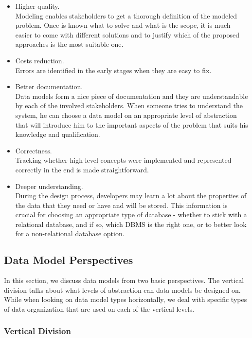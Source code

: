 \begin{itemize}
	\item Higher quality.\\ Modeling enables stakeholders to get a thorough definition of the modeled problem. Once is known what to solve and what is the scope, it is much easier to come with different solutions and to justify which of the proposed approaches is the most suitable one.
	
	\item Costs reduction.\\ Errors are identified in the early stages when they are easy to fix.
	
	\item Better documentation.\\ Data models form a nice piece of documentation and they are understandable by each of the involved stakeholders. When someone tries to understand the system, he can choose a data model on an appropriate level of abstraction that will introduce him to the important aspects of the problem that suits his knowledge and qualification.
	
	\item Correctness.\\ Tracking whether high-level concepts were implemented and represented correctly in the end is made straightforward.
	
	\item Deeper understanding.\\ During the design process, developers may learn a lot about the properties of the data that they need or have and will be stored. This information is crucial for choosing an appropriate type of database - whether to stick with a relational database, and if so, which DBMS is the right one, or to better look for a non-relational database option.
\end{itemize}

\subsection{Data Model Perspectives}

In this section, we discuss data models from two basic perspectives. 
The vertical division talks about what levels of abstraction can data models be designed on.
While when looking on data model types horizontally, we deal with specific types of data organization that are used on each of the vertical levels.

\subsubsection{Vertical Division}


